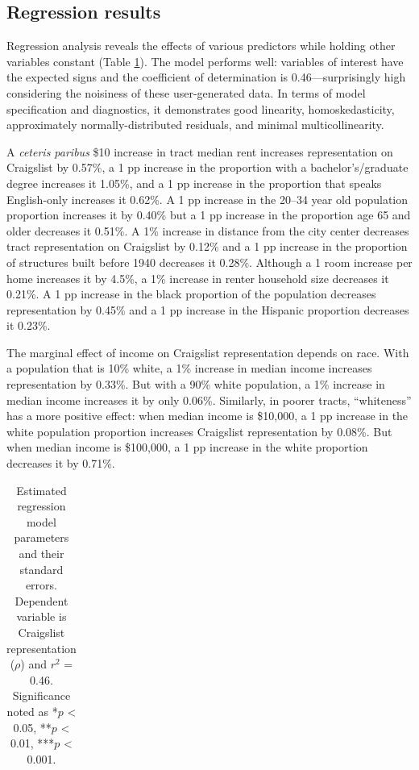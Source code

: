 \documentclass[11pt,onecolumn]{article} %
\begin{document}
\subsection{Regression results}

Regression analysis reveals the effects of various predictors while holding other variables constant (Table \ref{tab:regression_results}). The model performs well: variables of interest have the expected signs and the coefficient of determination is 0.46---surprisingly high considering the noisiness of these user-generated data. In terms of model specification and diagnostics, it demonstrates good linearity, homoskedasticity, approximately normally-distributed residuals, and minimal multicollinearity.

A \textit{ceteris paribus} \$10 increase in tract median rent increases representation on Craigslist by 0.57\%, a 1 pp increase in the proportion with a bachelor's/graduate degree increases it 1.05\%, and a 1 pp increase in the proportion that speaks English-only increases it 0.62\%. A 1 pp increase in the 20--34 year old population proportion increases it by 0.40\% but a 1 pp increase in the proportion age 65 and older decreases it 0.51\%. A 1\% increase in distance from the city center decreases tract representation on Craigslist by 0.12\% and a 1 pp increase in the proportion of structures built before 1940 decreases it 0.28\%. Although a 1 room increase per home increases it by 4.5\%, a 1\% increase in renter household size decreases it 0.21\%. A 1 pp increase in the black proportion of the population decreases representation by 0.45\% and a 1 pp increase in the Hispanic proportion decreases it 0.23\%. 

The marginal effect of income on Craigslist representation depends on race. With a population that is 10\% white, a 1\% increase in median income increases representation by 0.33\%. But with a 90\% white population, a 1\% increase in median income increases it by only 0.06\%. Similarly, in poorer tracts, \enquote{whiteness} has a more positive effect: when median income is \$10,000, a 1 pp increase in the white population proportion increases Craigslist representation by 0.08\%. But when median income is \$100,000, a 1 pp increase in the white proportion decreases it by 0.71\%.


\begin{small}
\begin{longtable}{l r r} 
	\caption{Estimated regression model parameters and their standard errors. Dependent variable is Craigslist representation ($\rho$) and $r^2$ = 0.46. Significance noted as *$p$ < 0.05, **$p$ < 0.01, ***$p$ < 0.001.}
	\label{tab:regression_results}
	
\end{longtable}
\end{small}
\end{document}
